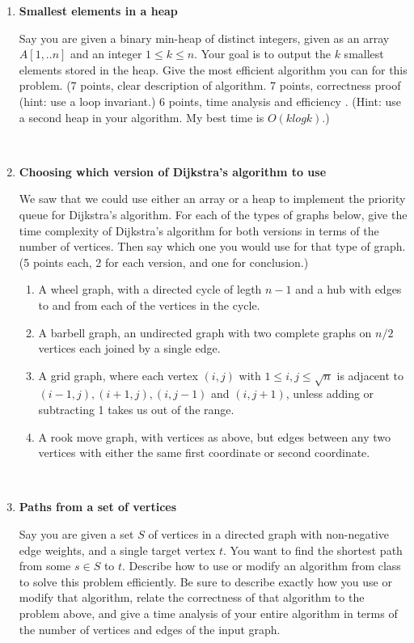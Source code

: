 \documentclass[12pt, letterpaper]{article}
\begin{document}
\begin{enumerate}
\-\ \newpage
\item \textbf{Smallest elements in a heap}

Say you are given a binary min-heap of distinct integers, given as an array $A[1,..n]$ and
an integer $1 \le k \le n$.  Your goal is to output the $k$ smallest elements stored in the heap.  Give the most efficient algorithm you can for this problem.
(7 points, clear description of algorithm.  7 points, correctness proof (hint: use a loop invariant.)  6 points, time analysis and efficiency .  (Hint: use a second heap in your algorithm.  My best time is $O(k log k)$.)


\-\ \newpage
\item \textbf{Choosing which version of Dijkstra's algorithm to use}

We saw that we could use either an array or a heap to implement the priority queue for Dijkstra's
algorithm.  For each of the types of graphs below, give the time complexity of Dijkstra's algorithm for both versions in terms of the number of vertices.  Then say which one you would use for that type of graph.  
(5 points each, 2 for each version, and one for conclusion.)

\begin{enumerate}
\item A wheel graph, with a directed cycle of legth $n-1$ and a hub with edges
to and from each of the vertices in the cycle.
\item A barbell graph, an undirected graph with two complete graphs on $n/2$ vertices each joined by a single edge.
\item A grid graph, where each vertex $(i,j)$ with $1 \le i,j \le \sqrt{n}$ is
adjacent to $(i-1,j), (i+1,j), (i,j-1)$ and $(i,j+1)$, unless adding or subtracting 1 takes us out of the range. 
\item A rook move graph, with vertices as above, but edges between any two vertices with either the same first coordinate or second coordinate. 
\end{enumerate}

\-\ \newpage
\item \textbf{Paths from a set of vertices}

Say you are given a set $S$ of vertices in a directed graph with non-negative
edge weights, and a single target vertex $t$.  You want to find the shortest path from some $s \in S$ to $t$.
Describe how to use or modify an algorithm
from class to solve this problem efficiently. Be sure to describe exactly how you use or modify that algorithm, relate the correctness of that algorithm to the problem above, and give a time analysis of your entire algorithm in terms of the number of vertices and edges of the input graph.



\end{enumerate}
\end{document}
